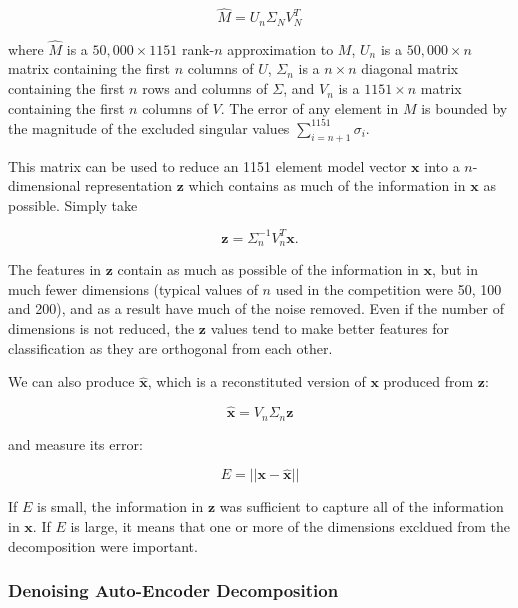 \documentclass{article}
\begin{document}
\begin{equation}
\hat{M} = U_n \Sigma_N V_N^T
\end{equation}

where $\hat{M}$ is a $50,000 \times 1151$ rank-$n$ approximation to $M$, $U_n$ is a $50,000 \times n$ matrix containing the first $n$ columns of $U$, $\Sigma_n$ is a $n \times n$ diagonal matrix containing the first $n$ rows and columns of $\Sigma$, and $V_n$ is a $1151 \times n$ matrix containing the first $n$ columns of $V$.  The error of any element in $M$ is bounded by the magnitude of the excluded singular values $\sum_{i=n+1}^{1151} \sigma_i$.

This matrix can be used to reduce an 1151 element model vector $\mathbf{x}$ into a $n$-dimensional representation $\mathbf{z}$ which contains as much of the information in $\mathbf{x}$ as possible.  Simply take

\begin{equation}
\label{eqn:svd-encode}
\mathbf{z} = \Sigma_n^{-1} V_n^T \mathbf{x} .
\end{equation}

The features in $\mathbf{z}$ contain as much as possible of the information in $\mathbf{x}$, but in much fewer dimensions (typical values of $n$ used in the competition were 50, 100 and 200), and as a result have much of the noise removed.  Even if the number of dimensions is not reduced, the $\mathbf{z}$ values tend to make better features for classification as they are orthogonal from each other.

We can also produce $\hat{\mathbf{x}}$, which is a reconstituted version of $\mathbf{x}$ produced from $\mathbf{z}$:

\begin{equation}
\hat{\mathbf{x}} = V_n \Sigma_n \mathbf{z}
\end{equation}

and measure its error:

\begin{equation}
\label{eqn:decomp-error}
E = || \mathbf{x - \hat{x}} ||
\end{equation}

If $E$ is small, the information in $\mathbf{z}$ was sufficient to capture all of the information in $\mathbf{x}$.  If $E$ is large, it means that one or more of the dimensions excldued from the decomposition were important.


\subsubsection{Denoising Auto-Encoder Decomposition}
\end{document}
